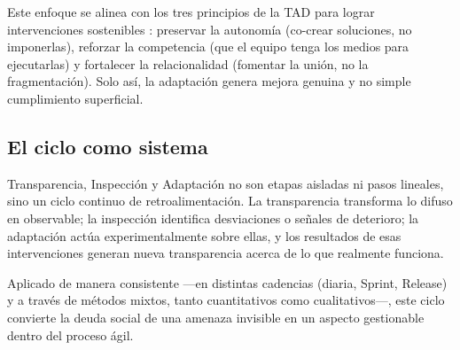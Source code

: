 Este enfoque se alinea con los tres principios de la TAD para lograr intervenciones sostenibles \cite{ryan_self-determination_2000}:
preservar la autonomía (co-crear soluciones, no imponerlas), reforzar la competencia (que el equipo tenga los medios para ejecutarlas) y fortalecer la relacionalidad (fomentar la unión, no la fragmentación).
Solo así, la adaptación genera mejora genuina y no simple cumplimiento superficial.

\FloatBarrier

\subsection{El ciclo como sistema}

Transparencia, Inspección y Adaptación no son etapas aisladas ni pasos lineales, sino un ciclo continuo de retroalimentación.
La transparencia transforma lo difuso en observable; la inspección identifica desviaciones o señales de deterioro; la adaptación actúa experimentalmente sobre ellas, y los resultados de esas intervenciones generan nueva transparencia acerca de lo que realmente funciona.

Aplicado de manera consistente —en distintas cadencias (diaria, Sprint, Release) y a través de métodos mixtos, tanto cuantitativos como cualitativos—, este ciclo convierte la deuda social de una amenaza invisible en un aspecto gestionable dentro del proceso ágil.

